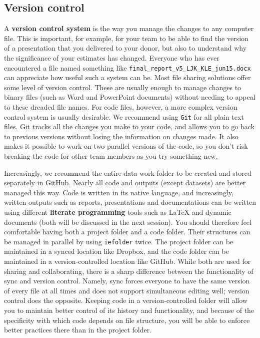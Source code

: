 \subsection{Version control}

A \textbf{version control system} is the way you manage the changes to any computer file.
This is important, for example, for your team to be able to find the version of a presentation that you delivered to your donor,
but also to understand why the significance of your estimates has changed.
Everyone who has ever encountered a file named something like \texttt{final\_report\_v5\_LJK\_KLE\_jun15.docx}
can appreciate how useful such a system can be.
Most file sharing solutions offer some level of version control.
These are usually enough to manage changes to binary files (such as Word and PowerPoint documents) without needing to appeal to these dreaded file names.
For code files, however, a more complex version control system is usually desirable.
We recommend using \texttt{Git} for all plain text files. 
Git tracks all the changes you make to your code, 
and allows you to go back to previous versions without losing the information on changes made. 
It also makes it possible to work on two parallel versions of the code, 
so you don't risk breaking the code for other team members as you try something new,

Increasingly, we recommend the entire data work folder
to be created and stored separately in GitHub.
Nearly all code and outputs (except datasets) are better managed this way. 
Code is written in its native language,
and increasingly, written outputs such as reports,
presentations and documentations can be written using different \textbf{literate programming}
tools such as {\LaTeX} and dynamic documents (both will be discussed in the next session).
You should therefore feel comfortable having both a project folder and a code folder.
Their structures can be managed in parallel by using \texttt{iefolder} twice.
The project folder can be maintained in a synced location like Dropbox,
and the code folder can be maintained in a version-controlled location like GitHub.
While both are used for sharing and collaborating,
there is a sharp difference between the functionality of sync and version control.
Namely, sync forces everyone to have the same version of every file at all times
and does not support simultaneous editing well; version control does the opposite.
Keeping code in a version-controlled folder will allow you
to maintain better control of its history and functionality,
and because of the specificity with which code depends on file structure,
you will be able to enforce better practices there than in the project folder.


